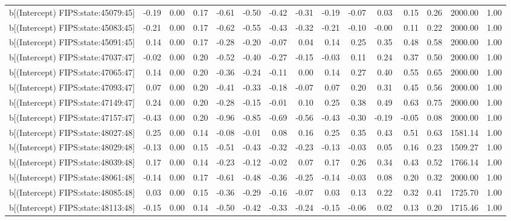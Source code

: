 \begin{table}[ht]
\begin{tabular}{rrrrrrrrrrrrrrr}
  b[(Intercept) FIPS:state:45079:45] & -0.19 & 0.00 & 0.17 & -0.61 & -0.50 & -0.42 & -0.31 & -0.19 & -0.07 & 0.03 & 0.15 & 0.26 & 2000.00 & 1.00 \\ 
  b[(Intercept) FIPS:state:45083:45] & -0.21 & 0.00 & 0.17 & -0.62 & -0.55 & -0.43 & -0.32 & -0.21 & -0.10 & -0.00 & 0.11 & 0.22 & 2000.00 & 1.00 \\ 
  b[(Intercept) FIPS:state:45091:45] & 0.14 & 0.00 & 0.17 & -0.28 & -0.20 & -0.07 & 0.04 & 0.14 & 0.25 & 0.35 & 0.48 & 0.58 & 2000.00 & 1.00 \\ 
  b[(Intercept) FIPS:state:47037:47] & -0.02 & 0.00 & 0.20 & -0.52 & -0.40 & -0.27 & -0.15 & -0.03 & 0.11 & 0.24 & 0.37 & 0.50 & 2000.00 & 1.00 \\ 
  b[(Intercept) FIPS:state:47065:47] & 0.14 & 0.00 & 0.20 & -0.36 & -0.24 & -0.11 & 0.00 & 0.14 & 0.27 & 0.40 & 0.55 & 0.65 & 2000.00 & 1.00 \\ 
  b[(Intercept) FIPS:state:47093:47] & 0.07 & 0.00 & 0.20 & -0.41 & -0.33 & -0.18 & -0.07 & 0.07 & 0.20 & 0.31 & 0.45 & 0.56 & 2000.00 & 1.00 \\ 
  b[(Intercept) FIPS:state:47149:47] & 0.24 & 0.00 & 0.20 & -0.28 & -0.15 & -0.01 & 0.10 & 0.25 & 0.38 & 0.49 & 0.63 & 0.75 & 2000.00 & 1.00 \\ 
  b[(Intercept) FIPS:state:47157:47] & -0.43 & 0.00 & 0.20 & -0.96 & -0.85 & -0.69 & -0.56 & -0.43 & -0.30 & -0.19 & -0.05 & 0.08 & 2000.00 & 1.00 \\ 
  b[(Intercept) FIPS:state:48027:48] & 0.25 & 0.00 & 0.14 & -0.08 & -0.01 & 0.08 & 0.16 & 0.25 & 0.35 & 0.43 & 0.51 & 0.63 & 1581.14 & 1.00 \\ 
  b[(Intercept) FIPS:state:48029:48] & -0.13 & 0.00 & 0.15 & -0.51 & -0.43 & -0.32 & -0.23 & -0.13 & -0.03 & 0.05 & 0.16 & 0.23 & 1509.27 & 1.00 \\ 
  b[(Intercept) FIPS:state:48039:48] & 0.17 & 0.00 & 0.14 & -0.23 & -0.12 & -0.02 & 0.07 & 0.17 & 0.26 & 0.34 & 0.43 & 0.52 & 1766.14 & 1.00 \\ 
  b[(Intercept) FIPS:state:48061:48] & -0.14 & 0.00 & 0.17 & -0.61 & -0.48 & -0.36 & -0.25 & -0.14 & -0.03 & 0.08 & 0.20 & 0.32 & 2000.00 & 1.00 \\ 
  b[(Intercept) FIPS:state:48085:48] & 0.03 & 0.00 & 0.15 & -0.36 & -0.29 & -0.16 & -0.07 & 0.03 & 0.13 & 0.22 & 0.32 & 0.41 & 1725.70 & 1.00 \\ 
  b[(Intercept) FIPS:state:48113:48] & -0.15 & 0.00 & 0.14 & -0.50 & -0.42 & -0.33 & -0.24 & -0.15 & -0.06 & 0.02 & 0.13 & 0.20 & 1715.46 & 1.00 \\ 

\end{tabular}
\end{table}

